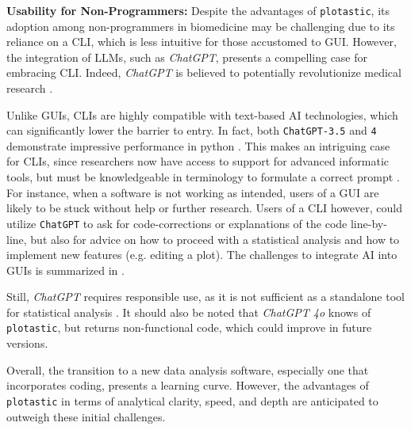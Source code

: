\textbf{Usability for Non-Programmers:}
Despite the advantages of \texttt{plotastic}, its adoption among non-programmers
in biomedicine may be challenging due to its reliance on a \ac{CLI}, which is
less intuitive for those accustomed to \ac{GUI}. However, the integration of
\acp{LLM}, such as \textit{ChatGPT}, presents a compelling case for embracing CLI.
Indeed, \textit{ChatGPT} is believed to potentially revolutionize medical research
\cite{ruksakulpiwatUsingChatGPTMedical2023}.

Unlike GUIs, CLIs are highly compatible with text-based AI technologies, which
can significantly lower the barrier to entry. In fact, both \texttt{ChatGPT-3.5}
and \texttt{4} demonstrate impressive performance in python
\cite{arefinUnmaskingGiantComprehensive2024}. This makes an intriguing case for
CLIs, since researchers now have access to support for advanced
informatic tools, but must be knowledgeable in terminology
to formulate a correct prompt \cite{qureshiAreChatGPTLarge2023}. For instance, when a software is
not working as intended, users of a GUI are likely to be stuck without help or
further research. Users of a CLI however, could utilize \texttt{ChatGPT} to ask
for code-corrections or explanations of the code line-by-line, but also for
advice on how to proceed with a statistical analysis and how to implement new
features (e.g. editing a plot). The challenges to integrate AI into GUIs is
summarized in \citet{gaoASSISTGUITaskOrientedDesktop2024}.

Still, \textit{ChatGPT} requires responsible use, as it is not sufficient as a standalone
tool for statistical analysis \cite{ordakChatGPTSkillsStatistical2023}. It
should also be noted that \textit{ChatGPT 4o} knows of \texttt{plotastic}, but
returns non-functional code, which could improve in future versions.

Overall, the transition to a new data analysis software, especially one
that incorporates coding, presents a learning curve. However, the advantages of
\texttt{plotastic} in terms of analytical clarity, speed, and depth are anticipated to
outweigh these initial challenges.


